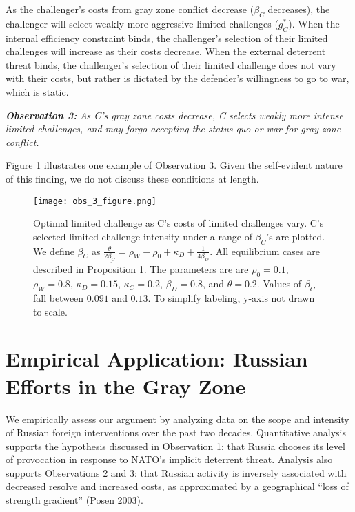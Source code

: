 \documentclass[
]{article}
\begin{document}
As the challenger's costs from gray zone conflict decrease (\(\beta_{C}\) decreases), the challenger will select weakly more aggressive limited challenges (\(g_{C}^{*}\)). When the internal efficiency constraint binds, the challenger's selection of their limited challenges will increase as their costs decrease. When the external deterrent threat binds, the challenger's selection of their limited challenge does not vary with their costs, but rather is dictated by the defender's willingness to go to war, which is static.

\textbf{\textit{Observation 3:}}\textit{ As C's gray zone costs decrease, C selects weakly more intense limited challenges, and may forgo accepting the status quo or war for gray zone conflict.}

Figure \ref{fig:optimalcostvary} illustrates one example of Observation 3. Given the self-evident nature of this finding, we do not discuss these conditions at length.

\begin{figure}[h]
        \centering
        \texttt{[image: obs\_3\_figure.png]}
        \caption{Optimal limited challenge as C's costs of limited challenges vary. C's selected limited challenge intensity under a range of $\beta_C$'s are plotted. We define $\underline{\beta_C}$ as $\frac{\theta}{2\underline{\beta_{C}}}=\rho_{W}-\rho_{0}+\kappa_{D}+\frac{1}{4\beta_{D}}$. All equilibrium cases are described in Proposition 1. The parameters are are $\rho_0=0.1$, $\rho_W=0.8$, $\kappa_D=0.15$, $\kappa_{C}=0.2$, $\beta_D=0.8$, and $\theta=0.2$. Values of $\beta_C$ fall between $0.091$ and $0.13$. To simplify labeling, y-axis not drawn to scale.}
    \label{fig:optimalcostvary}
    \end{figure}

\hypertarget{empirical-application-russian-efforts-in-the-gray-zone}{%
\section{Empirical Application: Russian Efforts in the Gray Zone}\label{empirical-application-russian-efforts-in-the-gray-zone}}

We empirically assess our argument by analyzing data on the scope and intensity of Russian foreign interventions over the past two decades. Quantitative analysis supports the hypothesis discussed in Observation 1: that Russia chooses its level of provocation in response to NATO's implicit deterrent threat. Analysis also supports Observations 2 and 3: that Russian activity is inversely associated with decreased resolve and increased costs, as approximated by a geographical ``loss of strength gradient'' (Posen 2003).
\end{document}
